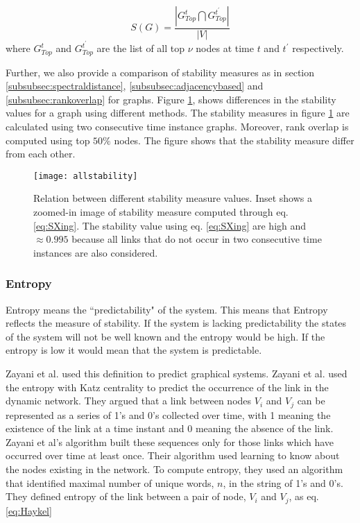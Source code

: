 \documentclass[preprint, twocolumn,5p]{elsarticle}
\begin{document}
        \begin{equation}\label{eq:rankoverlap}
        S(G) = \frac{|G_{Top}^{t}\bigcap G_{Top}^{t^{'}}|}{|V|}
        \end{equation}
        where $G_{Top}^{t}$ and $G_{Top}^{t^{'}}$ are the list of all top $\nu$ nodes at time $t$ and $t^{'}$ respectively.

        Further, we also provide a comparison of stability measures as in section \ref{subsubsec:spectraldistance}, \ref{subsubsec:adjacencybased} and \ref{subsubsec:rankoverlap} for graphs. Figure \ref{fig:allstability}, shows differences in the stability values for a graph using different methods. The stability measures in figure \ref{fig:allstability} are calculated using two consecutive time instance graphs. Moreover, rank overlap is computed using top $50\%$ nodes. The figure shows that the stability measure differ from each other.

        \begin{figure}
            \centering
            \texttt{[image: allstability]}
            \caption{Relation between different stability measure values. Inset shows a zoomed-in image of stability measure computed through eq. \ref{eq:SXing}. The stability value using eq. \ref{eq:SXing} are high and $\approx0.995$ because all links that do not occur in two consecutive time instances are also considered.}
            \label{fig:allstability}
        \end{figure}

        \subsubsection{Entropy}\label{subsubsec:entropy}
        Entropy means the ``predictability" of the system. This means that Entropy reflects the measure of stability. If the system is lacking predictability the states of the system will not be well known and the entropy would be high. If the entropy is low it would mean that the system is predictable.

        Zayani et al. \cite{Zayani2012} used this definition to predict graphical systems. Zayani et al. used the entropy with Katz centrality to predict the occurrence of the link in the dynamic network. They argued that a link between nodes $V_{i}$ and $V_{j}$ can be represented as a series of 1's and 0's collected over time, with 1 meaning the existence of the link at a time instant and 0 meaning the absence of the link. Zayani et al's algorithm built these sequences only for those links which have occurred over time at least once. Their algorithm used learning to know about the nodes existing in the network. To compute entropy, they used an algorithm that identified maximal number of unique words, $n$, in the string of 1's and 0's. They defined entropy of the link between a pair of node, $V_{i}$ and $V_{j}$, as eq. \ref{eq:Haykel}
\end{document}
